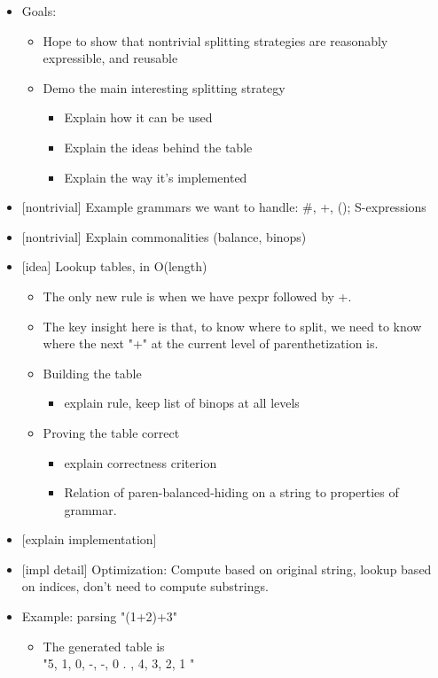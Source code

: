   \begin{itemize} \item  Goals:
    \begin{itemize} \item  Hope to show that nontrivial splitting strategies are reasonably expressible, and reusable 
    \item  Demo the main interesting splitting strategy 
      \begin{itemize} \item  Explain how it can be used 
      \item  Explain the ideas behind the table 
      \item  Explain the way it's implemented \end{itemize} \end{itemize}
  \item  {}[nontrivial] Example grammars we want to handle: \#, +, (); S-expressions
  \item  {}[nontrivial] Explain commonalities (balance, binops)
  \item  {}[idea] Lookup tables, in O(length)
    \begin{itemize} \item  The only new rule is when we have pexpr followed by +. 
    \item  The key insight here is that, to know where to split, we need to know where the next "+" at the current level of parenthetization is. 
    \item  Building the table 
      \begin{itemize} \item  explain rule, keep list of binops at all levels \end{itemize} 
    \item  Proving the table correct 
      \begin{itemize} \item  explain correctness criterion 
      \item  Relation of paren-balanced-hiding on a string to properties of grammar. \end{itemize} \end{itemize}
  \item  {}[explain implementation]
  \item  {}[impl detail] Optimization: Compute based on original string, lookup based on indices, don't need to compute substrings.
  \item  Example: parsing "(1+2)+3"
    \begin{itemize} \item  The generated table is  \\
      "5, 1, 0, -, -, 0 .
        , 4, 3, 2, 1
      "
\end{itemize} \end{itemize}